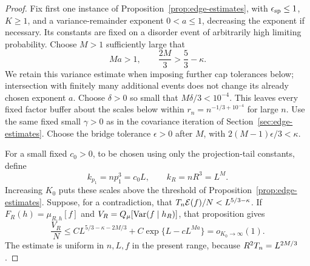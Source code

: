 \begin{proof}
Fix first one instance of Proposition~\ref{prop:edge-estimates}, with
\(\epsilon_{\rm sp}\le1\), \(K\ge1\), and a variance-remainder exponent
\(0<a\le1\), decreasing the exponent if necessary.  Its constants are fixed on a
disorder event of arbitrarily high limiting probability.  Choose
\(M>1\) sufficiently large that
\[
 Ma>1,\qquad \frac{2M}{3}>\frac53-\kappa .
\]
We retain this variance estimate when imposing further cap tolerances
below; intersection with finitely many additional events does not change
its already chosen exponent \(a\).  Choose \(\delta>0\) so small that
\(M\delta/3<10^{-4}\).  This leaves every fixed factor buffer about the
scales below within \(r_n=n^{-1/3+10^{-4}}\) for large \(n\).
Use the same fixed small \(\gamma>0\) as in the covariance iteration
of Section~\ref{sec:edge-estimates}.  Choose the bridge tolerance
\(\epsilon>0\) after \(M\), with
\(2(M-1)\epsilon/3<\kappa\).

For a small fixed \(c_0>0\), to be chosen using only the projection-tail
constants, define
\[
 k_{p_1}=np_1^3=c_0L,\qquad k_R=nR^3=L^M.
\]
Increasing \(K_0\) puts these scales above the threshold of
Proposition~\ref{prop:edge-estimates}.  Suppose, for a contradiction, that
\(T_n\mathcal E(f)/N<L^{5/3-\kappa}\).  If
\(F_R(h)=\mu_{R,h}[f]\) and
\(V_R=Q_\mu[\operatorname{Var}(f\mid h_R)]\), that proposition gives
\begin{equation}
 \frac{V_R}{N}
 \le C L^{5/3-\kappa-2M/3}
       +C\exp\{L-cL^{Ma}\}=o_{K_0\to\infty}(1).
                                                               \label{warm:small-variance}
\end{equation}
The estimate is uniform in \(n,L,f\) in the present range, because
\(R^2T_n=L^{2M/3}\).


\end{proof}
